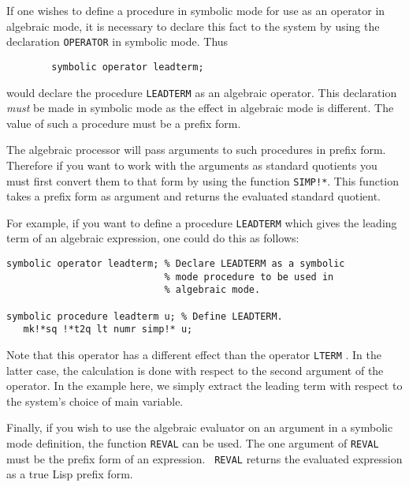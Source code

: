 If one wishes to define a procedure in symbolic mode for use as an
operator in algebraic mode, it is necessary to declare this fact to the
system by using the declaration \texttt{OPERATOR} in
symbolic mode. Thus
\begin{verbatim}
        symbolic operator leadterm;
\end{verbatim}
would declare the procedure \texttt{LEADTERM} as an algebraic operator. This
declaration \emph{must} be made in symbolic mode as the effect in algebraic
mode is different.  The value of such a procedure must be a prefix form.

The algebraic processor will pass arguments to such procedures in prefix
form. Therefore if you want to work with the arguments as standard
quotients you must first convert them to that form by using the function
\texttt{SIMP!*}. This function takes a prefix form as argument and returns the
evaluated standard quotient.

For example, if you want to define a procedure \texttt{LEADTERM} which gives the
leading term of an algebraic expression, one could do this as follows:
\begin{samepage}
\begin{verbatim}
symbolic operator leadterm; % Declare LEADTERM as a symbolic
                            % mode procedure to be used in
                            % algebraic mode.

symbolic procedure leadterm u; % Define LEADTERM.
   mk!*sq !*t2q lt numr simp!* u;
\end{verbatim}
\end{samepage}
Note that this operator has a different effect than the operator \texttt{LTERM}
.  In the latter case, the calculation is done
with respect to the second argument of the operator.  In the example here,
we simply extract the leading term with respect to the system's choice of
main variable.

Finally, if you wish to use the algebraic evaluator on an argument in a
symbolic mode definition, the function \texttt{REVAL} can be used.  The one
argument of \texttt{REVAL} must be the prefix form of an expression. {\tt
REVAL} returns the evaluated expression as a true Lisp prefix form.

